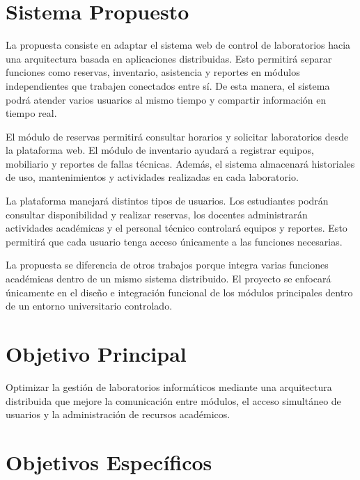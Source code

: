 \documentclass[12pt,a4paper]{article}
\begin{document}
\normalsize


\section{Sistema Propuesto}

La propuesta consiste en adaptar el sistema web de control de laboratorios hacia una arquitectura basada en aplicaciones distribuidas. Esto permitirá separar funciones como reservas, inventario, asistencia y reportes en módulos independientes que trabajen conectados entre sí. De esta manera, el sistema podrá atender varios usuarios al mismo tiempo y compartir información en tiempo real.

\vspace{0.2cm}

El módulo de reservas permitirá consultar horarios y solicitar laboratorios desde la plataforma web. El módulo de inventario ayudará a registrar equipos, mobiliario y reportes de fallas técnicas. Además, el sistema almacenará historiales de uso, mantenimientos y actividades realizadas en cada laboratorio.

\vspace{0.2cm}

La plataforma manejará distintos tipos de usuarios. Los estudiantes podrán consultar disponibilidad y realizar reservas, los docentes administrarán actividades académicas y el personal técnico controlará equipos y reportes. Esto permitirá que cada usuario tenga acceso únicamente a las funciones necesarias.

\vspace{0.2cm}

La propuesta se diferencia de otros trabajos porque integra varias funciones académicas dentro de un mismo sistema distribuido. El proyecto se enfocará únicamente en el diseño e integración funcional de los módulos principales dentro de un entorno universitario controlado. 




\section{Objetivo Principal}

Optimizar la gestión de laboratorios informáticos mediante una arquitectura distribuida que mejore la comunicación entre módulos, el acceso simultáneo de usuarios y la administración de recursos académicos.



\section{Objetivos Específicos}
\end{document}
